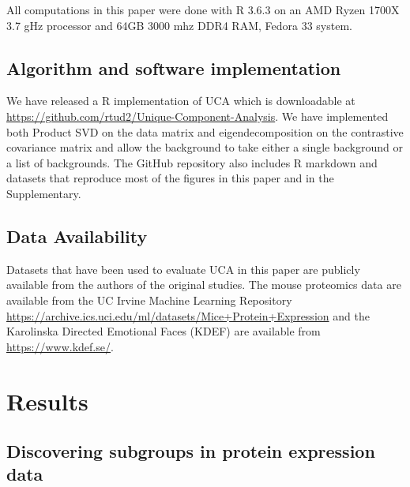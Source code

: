 \documentclass[nocrop]{bioinfo}
\begin{document}
\begin{methods}
All computations in this paper were done with R 3.6.3 \cite{baseR} on an AMD Ryzen 1700X 3.7 gHz processor and 64GB 3000 mhz DDR4 RAM, Fedora 33 system. 

\subsection{Algorithm and software implementation}
We have released a R implementation of UCA which is downloadable at \url{https://github.com/rtud2/Unique-Component-Analysis}. We have implemented both Product SVD on the data matrix and eigendecomposition on the contrastive covariance matrix and allow the background to take either a single background or a list of backgrounds. The GitHub repository also includes R markdown and datasets that reproduce most of the figures in this paper and in the Supplementary.

\subsection{Data Availability}
Datasets that have been used to evaluate UCA in this paper are publicly available from the authors of the original studies. The mouse proteomics data are available from the UC Irvine Machine Learning Repository \url{https://archive.ics.uci.edu/ml/datasets/Mice+Protein+Expression} and the Karolinska Directed Emotional Faces (KDEF) are available from \url{https://www.kdef.se/}.
\section{Results\label{sec:results}}
\subsection{\label{sec:mouse}Discovering subgroups in protein expression data}


\end{methods}
\end{document}

